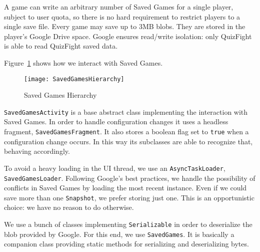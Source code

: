 A game can write an arbitrary number of Saved Games for a single player,
subject to user quota, so there is no hard requirement to restrict players
to a single save file.
Every game may save up to 3MB blobs. They are stored in the player's Google
Drive space. Google ensures read/write isolation: only QuizFight is able to
read QuizFight saved data.

Figure~\ref{fig:saved-games-hierarchy} shows how we interact with Saved
Games.

\begin{figure}
	\centering
	\texttt{[image: SavedGamesHierarchy]}
	\caption{Saved Games Hierarchy}
	\label{fig:saved-games-hierarchy}
\end{figure}

\texttt{SavedGamesActivity} is a base abstract class implementing the
interaction with Saved Games. In order to handle configuration changes
it uses a headless fragment, \texttt{SavedGamesFragment}.
It also stores a boolean flag set to \texttt{true} when a configuration
change occurs. In this way its subclasses are able to recognize that,
behaving accordingly. 

To avoid a heavy loading in the UI thread, we use an
\texttt{AsyncTaskLoader}, \texttt{SavedGamesLoader}.
Following Google's best practices, we handle the possibility of conflicts
in Saved Games by loading the most recent instance. Even if we could save
more than one \texttt{Snapshot}, we prefer storing just one.
This is an opportunistic choice: we have no reason to do otherwise.

We use a bunch of classes implementing \texttt{Serializable} in order to
deserialize the blob provided by Google. For this end, we use
\texttt{SavedGames}.
It is basically a companion class providing static methods for serializing
and deserializing bytes. 
